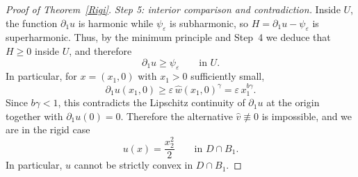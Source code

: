 \documentclass[10pt,a4paper]{amsart}
\begin{document}
\begin{proof}[Proof of Theorem~\ref{Rigi}]
\medskip
\noindent\textit{Step 5: interior comparison and contradiction.}
Inside $U$, the function $\partial_1u$ is harmonic while $\psi_\varepsilon$ is subharmonic,
so $H=\partial_1u-\psi_\varepsilon$ is superharmonic.
Thus, by the minimum principle and Step~4 we deduce that
$H\ge0$ inside $U$, and therefore
\[
\partial_1u\ge \psi_\varepsilon
\qquad\text{in }U.
\]
In particular, for $x=(x_1,0)$ with $x_1>0$ sufficiently small,
\[
\partial_1u(x_1,0)\ge \varepsilon\,\hat w(x_1,0)^\gamma
=
\varepsilon\,x_1^{b\gamma}.
\]
Since $b\gamma<1$, this contradicts the Lipschitz continuity of $\partial_1u$ at the origin
together with $\partial_1u(0)=0$.
Therefore the alternative $\hat v\not\equiv0$ is impossible, and we are in the rigid case
\[
u(x)=\frac{x_2^2}{2}
\qquad\text{in }D\cap B_1.
\]
In particular, $u$ cannot be strictly convex in $D\cap B_1$.
\end{proof}
\end{document}
